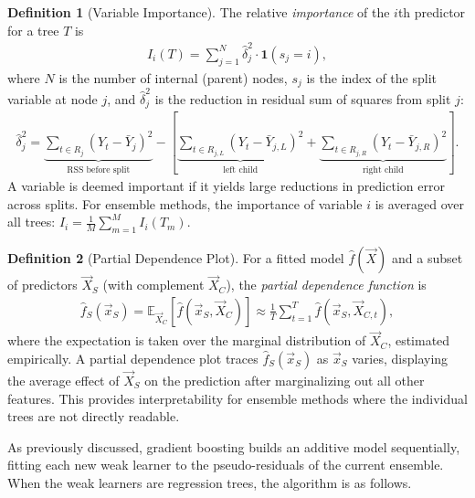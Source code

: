 \documentclass[11pt]{article}
\theoremstyle{definition}
\newtheorem{definition}{Definition}[section]
\theoremstyle{plain}
\theoremstyle{remark}
\begin{document}
\begin{definition}[Variable Importance]
    The relative \textit{importance} of the $i$th predictor for a tree $T$ is
    \begin{align}
        I_i(T) = \sum_{j=1}^N \hat{\delta}^2_j \cdot \mathbf{1}(s_j = i),
    \end{align}
    where $N$ is the number of internal (parent) nodes, $s_j$ is the index of the split variable at node $j$, and $\hat{\delta}^2_j$ is the reduction in residual sum of squares from split $j$:
    \begin{align}
        \hat{\delta}^2_j = \underbrace{\sum_{t \in R_j}(Y_t - \bar{Y}_j)^2}_{\text{RSS before split}} - \left[\underbrace{\sum_{t \in R_{j,L}}(Y_t - \bar{Y}_{j,L})^2}_{\text{left child}} + \underbrace{\sum_{t \in R_{j,R}}(Y_t - \bar{Y}_{j,R})^2}_{\text{right child}}\right].
    \end{align}
    A variable is deemed important if it yields large reductions in prediction error across splits. For ensemble methods, the importance of variable $i$ is averaged over all trees: $I_i = \frac{1}{M}\sum_{m=1}^M I_i(T_m)$.
\end{definition}

\begin{definition}[Partial Dependence Plot]
    For a fitted model $\hat{f}(\vec{X})$ and a subset of predictors $\vec{X}_S$ (with complement $\vec{X}_C$), the \textit{partial dependence function} is
    \begin{align}
        \hat{f}_S(\vec{x}_S) = \mathbb{E}_{\vec{X}_C}\!\left[\hat{f}(\vec{x}_S, \vec{X}_C)\right] \approx \frac{1}{T}\sum_{t=1}^T \hat{f}(\vec{x}_S, \vec{X}_{C,t}),
    \end{align}
    where the expectation is taken over the marginal distribution of $\vec{X}_C$, estimated empirically. A partial dependence plot traces $\hat{f}_S(\vec{x}_S)$ as $\vec{x}_S$ varies, displaying the average effect of $\vec{X}_S$ on the prediction after marginalizing out all other features. This provides interpretability for ensemble methods where the individual trees are not directly readable.
\end{definition}

As previously discussed, gradient boosting builds an additive model sequentially, fitting each new weak learner to the pseudo-residuals of the current ensemble. When the weak learners are regression trees, the algorithm is as follows.
\end{document}
